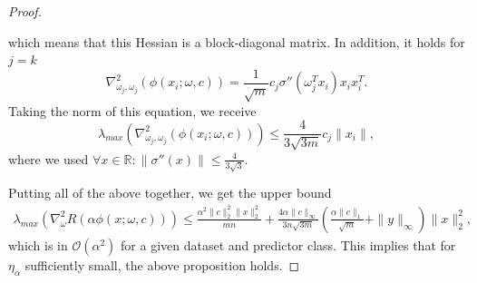 \documentclass[10pt,a4paper]{amsart}
\newcommand{\bR}{\mathbb{R}}
\newcommand{\cO}{\mathcal{O}}
\begin{document}
\begin{proof}
\begin{itemize}
        which means that this Hessian is a block-diagonal matrix. In addition, it holds for $j=k$
        $$\nabla^2_{\omega_j,\omega_j}(\phi(x_i;\omega,c))=\frac{1}{\sqrt{m}}c_j\sigma''(\omega_j^Tx_i)x_ix^T_i.$$
        Taking the norm of this equation, we receive
        $$\lambda_{max}\left(\nabla^2_{\omega_j,\omega_j}(\phi(x_i;\omega,c))\right)\leq \frac{4}{3\sqrt{3m}}c_j\|x_i\|,$$
        where we used $\forall x\in \bR:\|\sigma''(x)\|\leq \frac{4}{3\sqrt{3}}$.
    \end{itemize}
    Putting all of the above together, we get the upper bound
    \begin{align*}
        \lambda_{max}(\nabla_\omega^2R(\alpha\phi(x;\omega,c)))\leq \frac{\alpha^2\|c\|_2^2\|x\|_2^2}{mn}+\frac{4\alpha\|c\|_\infty}{3n\sqrt{3m}}\left(\frac{\alpha\|c\|_1}{\sqrt{m}}+\|y\|_\infty\right)\|x\|^2_2,
    \end{align*}
    which is in $\cO(\alpha^2)$ for a given dataset and predictor class. This implies that for $\eta_\alpha$ sufficiently small, the above proposition holds.
    \end{proof}
\end{document}
